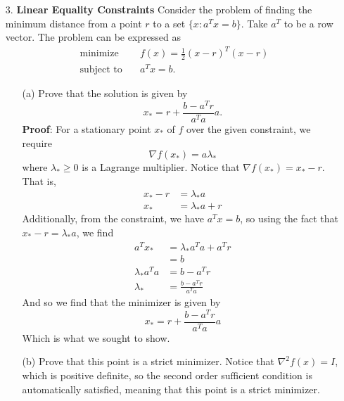 \documentclass{article}
\begin{document}
\begin{itemize}
    \item[3.] \textbf{Linear Equality Constraints}
    \newline\newline
    Consider the problem of finding the minimum distance from a point $r$ to a set $\{x : a^Tx = b\}.$ Take $a^T$ to be a row vector. The problem can be expressed as
    \begin{align*}
        \text{minimize} \hspace{1em} &f(x) = \frac{1}{2}(x - r)^T(x - r)\\
        \text{subject to} \hspace{1em} &a^Tx = b.
    \end{align*}
    \begin{itemize}
        \item[(a)] Prove that the solution is given by
        \[x_* = r + \frac{b - a^Tr}{a^Ta}a.\]
        \textbf{Proof}: For a stationary point $x_*$ of $f$ over the given constraint, we require
        \[\nabla f(x_*) = a\lambda_*\]
        where $\lambda_* \geq 0$ is a Lagrange multiplier. Notice that $\nabla f(x_*) = x_* - r$. That is,
        \begin{align*}
            x_* - r &= \lambda_*a\\
            x_* &= \lambda_*a + r
        \end{align*}
        Additionally, from the constraint, we have $a^Tx = b$, so using the fact that $x_* - r = \lambda_*a$, we find
        \begin{align*}
            a^Tx_* &= \lambda_*a^Ta + a^Tr\\
            &= b\\
            \lambda_*a^Ta &= b - a^Tr\\
            \lambda_* &= \frac{b - a^Tr}{a^Ta}
        \end{align*}
        And so we find that the minimizer is given by
        \[x_* = r + \frac{b - a^Tr}{a^Ta}a\]
        Which is what we sought to show.

        \item[(b)] Prove that this point is a strict minimizer.
        \newline\newline
        Notice that $\nabla^2f(x) = I$, which is positive definite, so the second order sufficient condition is automatically satisfied, meaning that this point is a strict minimizer.
        \newline


\end{itemize}
\end{itemize}
\end{document}
